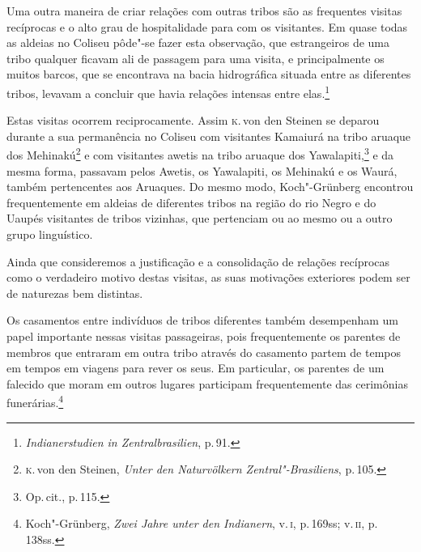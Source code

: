 Uma outra maneira de criar relações com outras tribos são as frequentes
visitas recíprocas e o alto grau de hospitalidade para com os
visitantes. Em quase todas as aldeias no Coliseu pôde"-se fazer esta
observação, que estrangeiros de uma tribo qualquer ficavam ali de
passagem para uma visita, e principalmente os muitos barcos, que se
encontrava na bacia hidrográfica situada entre as diferentes tribos,
levavam a concluir que havia relações intensas entre elas.\footnote{\textit{Indianerstudien
  in Zentralbrasilien}, p.\,91.}

Estas visitas ocorrem reciprocamente. Assim \textsc{k}.\,von den Steinen se
deparou durante a sua permanência no Coliseu com visitantes Kamaiurá na
tribo aruaque dos Mehinakú\footnote{\textsc{k}.\,von den Steinen, \textit{Unter den
  Naturvölkern Zentral"-Brasiliens}, p.\,105.} e com visitantes awetis na
tribo aruaque dos Yawalapiti,\footnote{Op.\,cit., p.\,115.} e da mesma
forma, passavam pelos Awetis, os Yawalapiti, os Mehinakú e os Waurá,
também pertencentes aos Aruaques. Do mesmo modo, Koch"-Grünberg encontrou
frequentemente em aldeias de diferentes tribos na região do rio Negro e
do Uaupés visitantes de tribos vizinhas, que pertenciam ou ao mesmo ou a
outro grupo linguístico.

Ainda que consideremos a justificação e a consolidação de relações
recíprocas como o verdadeiro motivo destas visitas, as suas motivações
exteriores podem ser de naturezas bem distintas.

{Os casamentos entre indivíduos de tribos diferentes também desempenham
um papel importante nessas visitas passageiras, pois frequentemente os
parentes de membros que entraram em outra tribo através do casamento
partem de tempos em tempos em viagens para rever os seus. Em particular,
os parentes de um falecido que moram em outros lugares participam
frequentemente das cerimônias funerárias.\footnote{Koch"-Grünberg,
  \textit{Zwei Jahre unter den Indianern}, v.\,\textsc{i}, p.\,169ss; v.\,\textsc{ii}, p.\,138ss.}}

